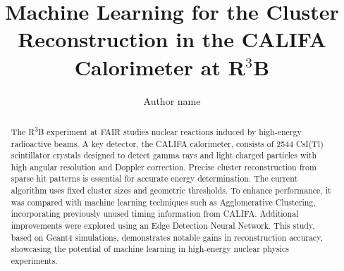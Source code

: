 \documentclass[final,5p,times,twocolumn]{elsarticle}
\begin{document}
\begin{frontmatter}



\title{Machine Learning for the Cluster Reconstruction in the CALIFA Calorimeter at R$^3$B}


\author[first]{Author name}
\address[first]{organization={University of the Moon},%
            addressline={}, 
            city={Earth},
            postcode={}, 
            state={},
            country={}}

\begin{abstract}
The R\textsuperscript{3}B experiment at FAIR studies nuclear reactions induced by high-energy radioactive beams. A key detector, the CALIFA calorimeter, consists of 2544 CsI(Tl) scintillator crystals designed to detect gamma rays and light charged particles with high angular resolution and Doppler correction.\newline
Precise cluster reconstruction from sparse hit patterns is essential for accurate energy determination. The current algorithm uses fixed cluster sizes and geometric thresholds. To enhance performance, it was compared with machine learning techniques such as Agglomerative Clustering, incorporating previously unused timing information from CALIFA. Additional improvements were explored using an Edge Detection Neural Network.\newline
This study, based on Geant4 simulations, demonstrates notable gains in reconstruction accuracy, showcasing the potential of machine learning in high-energy nuclear physics experiments.
\end{abstract}


\end{frontmatter}
\end{document}
